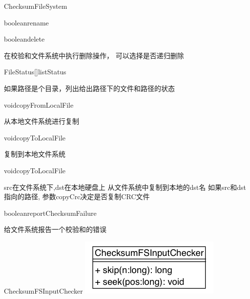 \begin{XeClass}{ChecksumFileSystem}
\begin{XeMethod}{\XePublic}{boolean}{rename}
    \end{XeMethod}

    \begin{XeMethod}{\XePublic}{boolean}{delete}
         
 在校验和文件系统中执行删除操作，
 可以选择是否递归删除

    \end{XeMethod}

    \begin{XeMethod}{\XePublic}{FileStatus[]}{listStatus}
         
 如果路径是个目录，列出给出路径下的文件和路径的状态

    \end{XeMethod}

    \begin{XeMethod}{\XePublic}{void}{copyFromLocalFile}
         
 从本地文件系统进行复制

    \end{XeMethod}

    \begin{XeMethod}{\XePublic}{void}{copyToLocalFile}
         
 复制到本地文件系统

    \end{XeMethod}

    \begin{XeMethod}{\XePublic}{void}{copyToLocalFile}
         
 src在文件系统下,dst在本地硬盘上
 从文件系统中复制到本地的dst名
 如果src和dst指向的路径, 参数copyCrc决定是否复制CRC文件

    \end{XeMethod}

    \begin{XeMethod}{\XePublic}{boolean}{reportChecksumFailure}
         
 给文件系统报告一个校验和的错误

    \end{XeMethod}

    \begin{XeInnerClass}{ChecksumFSInputChecker}
\includegraphics[width=\textwidth]{cdig/ChecksumFSInputChecker.png}
         

\end{XeInnerClass}
\end{XeClass}
